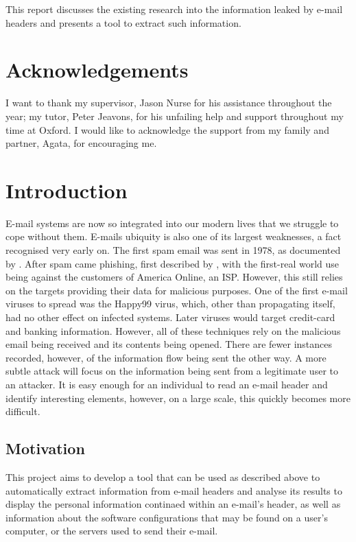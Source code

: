 \documentclass[twoside,10pt]{scrreprt}
\begin{document}
This report discusses the existing research into the information leaked by e-mail headers and presents a tool to extract such information.

\chapter*{Acknowledgements}
I want to thank my supervisor, Jason Nurse for his assistance throughout the year; my tutor, Peter Jeavons, for his unfailing help and support throughout my time at Oxford.  I would like to acknowledge the support from my family and partner, Agata, for encouraging me.

\tableofcontents
\listoftables
\listoffigures
\listofalgorithms

\chapter{Introduction}
E-mail systems are now so integrated into our modern lives that we struggle to cope without them.  E-mails ubiquity is also one of its largest weaknesses, a fact recognised very early on.  The first spam email was sent in 1978, as documented by \cite{templeton}.  After spam came phishing, first described by \cite{felix1987system}, with the first-real world use being against the customers of America Online, an ISP.  However, this still relies on the targets providing their data for malicious purposes.  One of the first e-mail viruses to spread was the Happy99 virus, which, other than propagating itself, had no other effect on infected systems.  Later viruses would target credit-card and banking information.  However, all of these techniques rely on the malicious email being received and its contents being opened.  There are fewer instances recorded, however, of the information flow being sent the other way.  A more subtle attack will focus on the information being sent from a legitimate user to an attacker.  It is easy enough for an individual to read an e-mail header and identify interesting elements, however, on a large scale, this quickly becomes more difficult.

\section{Motivation}
This project aims to develop a tool that can be used as described above to automatically extract information from e-mail headers and analyse its results to display the personal information continaed within an e-mail's header, as well as information about the software configurations that may be found on a user's computer, or the servers used to send their e-mail.
\end{document}
